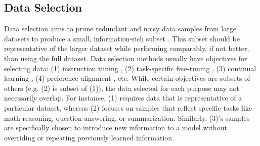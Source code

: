 \subsection{Data Selection}
Data selection aims to prune redundant and noisy data samples from large datasets to produce a small, information-rich subset \citep{delift, less}. This subset should be representative of the larger dataset while performing comparably, if not better, than using the full dataset. Data selection methods usually have objectives for selecting data: (1) instruction tuning \citep{selectit}, (2) task-specific fine-tuning \citep{tsds}, (3) continual learning \citep{delift}, (4) preference alignment \citep{deita}, etc. While certain objectives are subsets of others (e.g. (2) is subset of (1)), the data selected for each purpose may not necessarily overlap. For instance, (1) requires data that is representative of a particular dataset, whereas (2) focuses on samples that reflect specific tasks like math reasoning, question answering, or summarization. Similarly, (3)'s samples are specifically chosen to introduce new information to a model without overriding or repeating previously learned information.